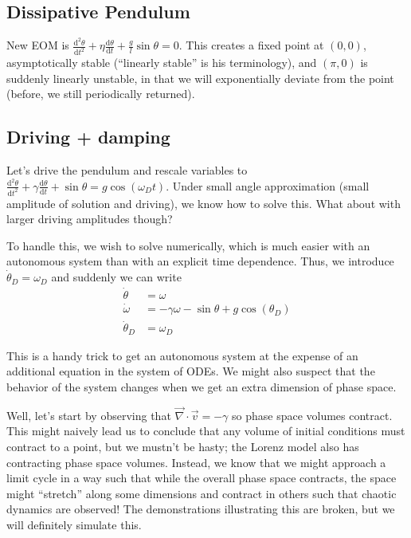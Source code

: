 \documentclass[12pt]{article}
\newcommand{\rd}[2]{\frac{\mathrm{d}#1}{\mathrm{d}#2}}
\newcommand{\rtd}[2]{\frac{\mathrm{d}^2#1}{\mathrm{d}#2^2}}
\begin{document}
\subsection{Dissipative Pendulum}

New EOM is $\rtd{\theta}{t} + \eta \rd{\theta}{t} + \frac{g}{l}\sin\theta = 0$.
This creates a fixed point at $(0,0)$, asymptotically stable (``linearly
stable'' is his terminology), and $(\pi,0)$ is suddenly linearly unstable, in
that we will exponentially deviate from the point (before, we still
periodically returned).

\subsection{Driving + damping}

Let's drive the pendulum and rescale variables to $\rtd{\theta}{t} + \gamma
\rd{\theta}{t} + \sin\theta = g\cos(\omega_D t)$. Under small angle
approximation (small amplitude of solution and driving), we know how to solve
this. What about with larger driving amplitudes though?

To handle this, we wish to solve numerically, which is much easier with an
autonomous system than with an explicit time dependence. Thus, we introduce
$\dot{\theta}_D = \omega_D$ and suddenly we can write
\begin{align}
    \dot{\theta} &= \omega \nonumber\\
    \dot{\omega} &= -\gamma \omega - \sin\theta + g\cos(\theta_D) \nonumber\\
    \dot{\theta}_D &= \omega_D
\end{align}

This is a handy trick to get an autonomous system at the expense of an
additional equation in the system of ODEs. We might also suspect that the
behavior of the system changes when we get an extra dimension of phase space.

Well, let's start by observing that $\vec{\nabla} \cdot \vec{v} = -\gamma$ so
phase space volumes contract. This might naively lead us to conclude that any
volume of initial conditions must contract to a point, but we mustn't be hasty;
the Lorenz model also has contracting phase space volumes. Instead, we know
that we might approach a limit cycle in a way such that while the overall phase
space contracts, the space might ``stretch'' along some dimensions and contract
in others such that chaotic dynamics are observed! The demonstrations
illustrating this are broken, but we will definitely simulate this.
\end{document}
